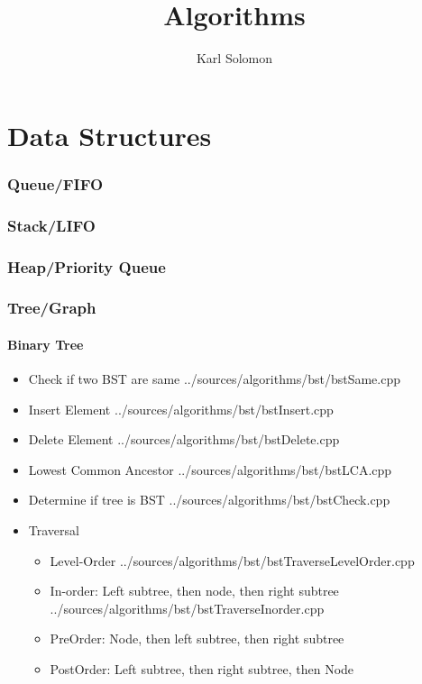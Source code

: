 \documentclass{article}
\begin{document}
\selectfont
\title{Algorithms}
\author{Karl Solomon}
\maketitle
\tableofcontents
\newpage
\part{Data Structures}
\section{Queue/FIFO}
\section{Stack/LIFO}
\section{Heap/Priority Queue}
\section{Tree/Graph}
\subsection{Binary Tree}
\begin{itemize}
	\item Check if two BST are same
	       {../sources/algorithms/bst/bstSame.cpp}
	\item Insert Element
	       {../sources/algorithms/bst/bstInsert.cpp}
	\item Delete Element
	       {../sources/algorithms/bst/bstDelete.cpp}
	\item Lowest Common Ancestor
	       {../sources/algorithms/bst/bstLCA.cpp}
	\item Determine if tree is BST
	       {../sources/algorithms/bst/bstCheck.cpp}
	\item Traversal
	      \begin{itemize}
		      \item Level-Order
		             {../sources/algorithms/bst/bstTraverseLevelOrder.cpp}
		      \item In-order: Left subtree, then node, then right subtree
		             {../sources/algorithms/bst/bstTraverseInorder.cpp}
		      \item PreOrder: Node, then left subtree, then right subtree
		      \item PostOrder: Left subtree, then right subtree, then Node
	      \end{itemize}
\end{itemize}
\end{document}
